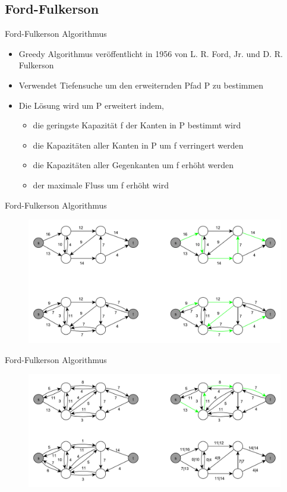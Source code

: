 \documentclass[18pt]{beamer}
\begin{document}
\subsection{Ford-Fulkerson}
\begin{frame}{Ford-Fulkerson Algorithmus}
\begin{itemize}
	\item Greedy Algorithmus ver\"offentlicht in 1956 von L. R. Ford, Jr. und D. R. Fulkerson
	\item Verwendet Tiefensuche um den erweiternden Pfad P zu bestimmen
	\item Die L\"osung wird um P erweitert indem, 
	\begin{itemize}
		\pause
		\item die geringste Kapazit\"at f der Kanten in P bestimmt wird
		\pause
		\item die Kapazit\"aten aller Kanten in P um f verringert werden
		\pause
		\item die Kapazit\"aten aller Gegenkanten um f erh\"oht werden
		\pause
		\item der maximale Fluss um f erh\"oht wird
	\end{itemize}  
\end{itemize}
\end{frame}

\begin{frame}{Ford-Fulkerson Algorithmus}
\begin{figure}
\includegraphics[width = \textwidth]{img/Jakob_Ford.pdf}
\end{figure}
\end{frame}

\begin{frame}{Ford-Fulkerson Algorithmus}
\begin{figure}
	\includegraphics[width = \textwidth]{img/Jakob_Ford2.pdf}
\end{figure}
\end{frame}
\end{document}
